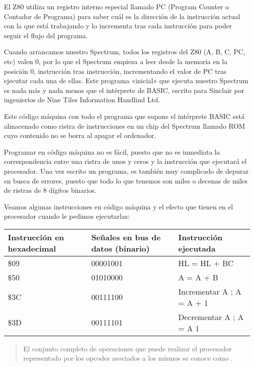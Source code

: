 \documentclass[letterpaper,10pt,spanish]{sphinxmanual}
\begin{document}
El Z80 utiliza un registro interno especial llamado PC (Program Counter o Contador de Programa) para saber cuál es la dirección de la instrucción actual con la que está trabajando y lo incrementa tras cada instrucción para poder seguir el flujo del programa.

Cuando arrancamos nuestro Spectrum, todos los registros del Z80 (A, B, C, PC, etc) valen 0, por lo que el Spectrum empieza a leer desde la memoria en la posición 0, instrucción tras instrucción, incrementando el valor de PC tras ejecutar cada una de ellas. Este programa «inicial» que ejecuta nuestro Spectrum es nada más y nada menos que el intérprete de BASIC, escrito para Sinclair por ingenierios de Nine Tiles Information Handlind Ltd.

Este código máquina con todo el programa que supone el intérprete BASIC está almacenado como ristra de instrucciones en un chip del Spectrum llamado ROM cuyo contenido no se borra al apagar el ordenador.

Programar en código máquina no es fácil, puesto que no es inmediata la correspondencia entre una ristra de unos y ceros y la instrucción que ejecutará el procesador. Una vez escrito un programa, es también muy complicado de depurar en busca de errores, puesto que todo lo que tenemos son miles o decenas de miles de ristras de 8 dígitos binarios.

Veamos algunas instrucciones en código máquina y el efecto que tienen en el procesador cuando le pedimos ejecutarlas:


\begin{savenotes}\sphinxattablestart
\centering
\begin{tabulary}{\linewidth}[t]{|T|T|T|}
\hline
\sphinxstyletheadfamily 
Instrucción en hexadecimal
&\sphinxstyletheadfamily 
Señales en bus de datos (binario)
&\sphinxstyletheadfamily 
Instrucción ejecutada
\\
\hline
\$09
&
00001001
&
HL = HL + BC
\\
\hline
\$50
&
01010000
&
A = A + B
\\
\hline
\$3C
&
00111100
&
Incrementar A ; A = A + 1
\\
\hline
\$3D
&
00111101
&
Decrementar A ; A = A \sphinxhyphen{} 1
\\
\hline
\end{tabulary}
\par
\sphinxattableend\end{savenotes}
\begin{quote}

El conjunto completo de operaciones que puede realizar el procesador representado por los opcodes asociados a los mismos se conoce como .
\end{quote}
\end{document}
